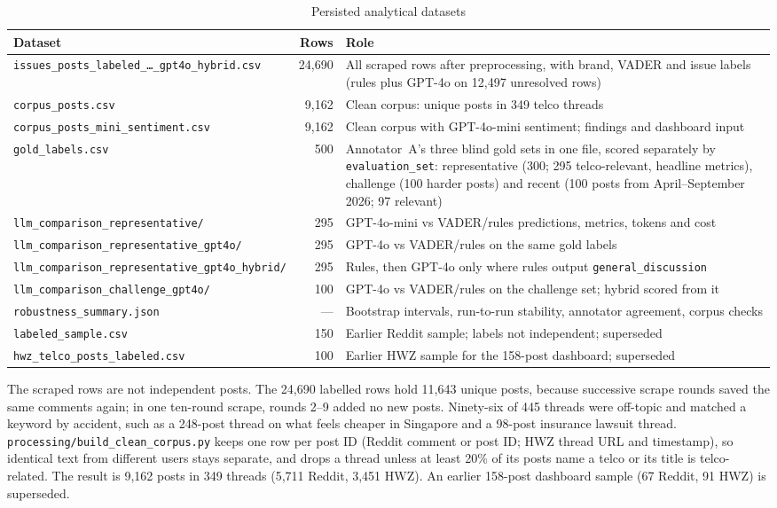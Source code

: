 \documentclass[11pt,a4paper]{article}
\begin{document}
\begin{table}[H]
\centering
\caption{Persisted analytical datasets}
\label{tab:data}
\begin{tabularx}{\textwidth}{@{}p{}rX@{}}
\toprule
\textbf{Dataset} & \textbf{Rows} & \textbf{Role} \\
\midrule
\texttt{issues\_posts\_labeled\_\ldots\_gpt4o\_hybrid.csv} & 24,690 & All scraped rows after preprocessing, with brand, VADER and issue labels (rules plus GPT-4o on 12,497 unresolved rows) \\
\texttt{corpus\_posts.csv} & 9,162 & Clean corpus: unique posts in 349 telco threads \\
\texttt{corpus\_posts\_mini\_sentiment.csv} & 9,162 & Clean corpus with GPT-4o-mini sentiment; findings and dashboard input \\
\texttt{gold\_labels.csv} & 500 & Annotator~A's three blind gold sets in one file, scored separately by \texttt{evaluation\_set}: representative (300; 295 telco-relevant, headline metrics), challenge (100 harder posts) and recent (100 posts from April--September 2026; 97 relevant) \\
\texttt{llm\_comparison\_representative/} & 295 & GPT-4o-mini vs VADER/rules predictions, metrics, tokens and cost \\
\texttt{llm\_comparison\_representative\_gpt4o/} & 295 & GPT-4o vs VADER/rules on the same gold labels \\
\texttt{llm\_comparison\_representative\_gpt4o\_hybrid/} & 295 & Rules, then GPT-4o only where rules output \texttt{general\_discussion} \\
\texttt{llm\_comparison\_challenge\_gpt4o/} & 100 & GPT-4o vs VADER/rules on the challenge set; hybrid scored from it \\
\texttt{robustness\_summary.json} & --- & Bootstrap intervals, run-to-run stability, annotator agreement, corpus checks \\
\texttt{labeled\_sample.csv} & 150 & Earlier Reddit sample; labels not independent; superseded \\
\texttt{hwz\_telco\_posts\_labeled.csv} & 100 & Earlier HWZ sample for the 158-post dashboard; superseded \\
\bottomrule
\end{tabularx}
\end{table}

The scraped rows are not independent posts. The 24,690 labelled rows hold 11,643 unique posts, because successive scrape rounds saved the same comments again; in one ten-round scrape, rounds 2--9 added no new posts. Ninety-six of 445 threads were off-topic and matched a keyword by accident, such as a 248-post thread on what feels cheaper in Singapore and a 98-post insurance lawsuit thread. \texttt{processing/build\_clean\_corpus.py} keeps one row per post ID (Reddit comment or post ID; HWZ thread URL and timestamp), so identical text from different users stays separate, and drops a thread unless at least 20\% of its posts name a telco or its title is telco-related. The result is 9,162 posts in 349 threads (5,711 Reddit, 3,451 HWZ). An earlier 158-post dashboard sample (67 Reddit, 91 HWZ) is superseded.
\end{document}

